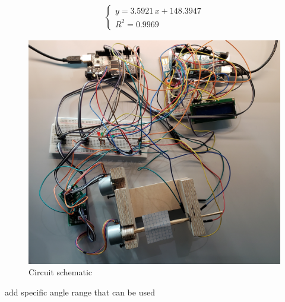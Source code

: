 \begin{align*}
    \begin{cases}
        y = 3.5921\,x + 148.3947 \\
        R^2 = 0.9969 
    \end{cases}
\end{align*}



\begin{figure}[H]
    \centering
   \includegraphics[width=\textwidth]{figures/circuit_pic.jpg}
    \caption{Circuit schematic}
     \label{fig:implented_design}
\end{figure}



add specific angle range that can be used